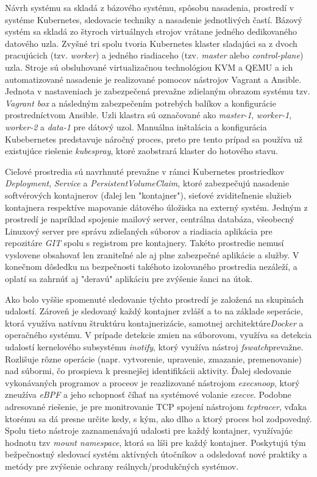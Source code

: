 Návrh systému sa skladá z bázového systému, spôsobu nasadenia, prostredí v systéme Kubernetes, sledovacie techniky a nasadenie jednotlivých častí. Bázový systém sa skladá zo štyroch virtuálnych strojov vrátane jedného dedikovaného datového uzla. Zvyšné tri spolu tvoria Kubernetes klaster sladajúci sa z dvoch pracujúcich (tzv. \textit{worker}) a jedného riadiaceho (tzv. \textit{master} alebo \textit{control-plane}) uzla. Stroje sú obsluhované virtualizačnou technológiou KVM a QEMU a ich automatizované nasadenie je realizované pomocov nástrojov Vagrant a Ansible. Jednota v nastaveniach je zabezpečená prevažne zdielaným obrazom systému tzv. \textit{Vagrant box} a následným zabezpečením potrebých balíkov a konfigurácie prostredníctvom Ansible. Uzli klastra sú označované ako \textit{master-1}, \textit{worker-1}, \textit{worker-2} a \textit{data-1} pre dátový uzol. Manuálna inštalácia a konfigurácia Kubebernetes predstavuje náročný proces, preto pre tento prípad sa používa už existujúce riešenie \textit{kubespray}, ktoré zaobstrará klaster do hotového stavu.

Cieľové prostredia sú navrhnuté prevažne v rámci Kubernetes prostriedkov \textit{Deployment}, \textit{Service} a \textit{PersistentVolumeClaim}, ktoré zabezpečujú nasadenie softvérových kontajnerov (ďalej len "kontajner"), sieťové zviditeľnenie služieb kontajnera respektíve mapovanie dátového úložiska na externý systém. Jedným z prostredí je napríklad spojenie mailový server, centrálna databáza, všeobecný Linuxový server pre správu zdieľaných súborov a riadiacia aplikácia pre repozitáre \textit{GIT} spolu s registrom pre kontajnery. Takéto prostredie nemusí vyslovene obsahovať len zraniteľné ale aj plne zabezpečné aplikácie a služby. V konečnom dôsledku na bezpečnosti takéhoto izolovaného prostredia nezáleží, a oplatí sa zahrnúť aj "deravú" aplikáciu pre zvýšenie šanci na útok.

Ako bolo vyššie spomenuté sledovanie týchto prostredí je založená na skupinách udalostí. Zároveň je sledovaný každý kontajner zvlášť a to na základe seperácie, ktorá využíva natívnu štruktúru kontajnerizácie, samotnej architektúre\textit{Docker} a operačného systému. V prípade detekcie zmien na súborovom, využíva sa detekcia udalostí kernelového subsystému \textit{inotify}, ktorý využíva nástroj \textit{fswatch}prevažne. Rozlišuje rôzne operácie (napr. vytvorenie, upravenie, zmazanie, premenovanie) nad súbormi, čo prospieva k presnejšej identifikácii aktivity. Ďalej sledovanie vykonávaných programov a proceov je reazlizované nástrojom \textit{execsnoop}, ktorý zneužíva \textit{eBPF} a jeho schopnosť číhať na systémové volanie \textit{execve}. Podobne adresované riešenie, je pre monitrovanie TCP spojení nástrojom \textit{tcptracer}, vďaka ktorému sa dá presne určite kedy, s kým, ako dlho a ktorý proces bol zodpovedný. Spolu tieto nástroje zaznamenávajú udalosti pre každý kontajner, využívajúc hodnotu tzv \textit{mount namespace}, ktorá sa líši pre každý kontajner. Poskytujú tým bežpečnostný sledovací systém aktívných útočníkov a odsledovať nové praktiky a metódy pre zvýšenie ochrany reálnych/produkčných systémov.

